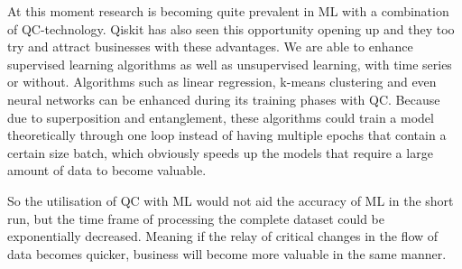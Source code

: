 At this moment research is becoming quite prevalent in ML with a combination of QC-technology. Qiskit has also seen this opportunity opening up and they too try and attract businesses with these advantages. We are able to enhance supervised learning algorithms as well as unsupervised learning, with time series or without. Algorithms such as linear regression, k-means clustering and even neural networks can be enhanced during its training phases with QC. Because due to superposition and entanglement, these algorithms could train a model theoretically through one loop instead of having multiple epochs that contain a certain size batch, which obviously speeds up the models that require a large amount of data to become valuable.

So the utilisation of QC with ML would not aid the accuracy of ML in the short run, but the time frame of processing the complete dataset could be exponentially decreased. Meaning if the relay of critical changes in the flow of data becomes quicker, business will become more valuable in the same manner.





